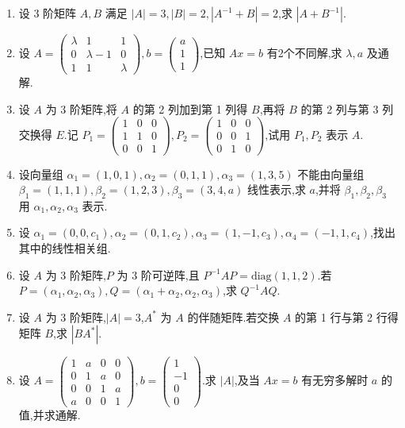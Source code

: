 \begin{enumerate}
	\item 设 3 阶矩阵 $A, B$ 满足 $|A|=3, |B|=2, |A^{-1}+B|=2$,求 $|A+B^{-1}|$.
	
	\item 设 $A = \begin{pmatrix} \lambda & 1 & 1 \\ 0 & \lambda-1 & 0 \\ 1 & 1 & \lambda \end{pmatrix}, b = \begin{pmatrix} a \\ 1 \\ 1 \end{pmatrix}$,已知 $Ax=b$ 有2个不同解,求 $\lambda, a$ 及通解.
	
	\item 设 $A$ 为 3 阶矩阵,将 $A$ 的第 2 列加到第 1 列得 $B$,再将 $B$ 的第 2 列与第 3 列交换得 $E$.记 $P_1 = \begin{pmatrix} 1 & 0 & 0 \\ 1 & 1 & 0 \\ 0 & 0 & 1 \end{pmatrix}, P_2 = \begin{pmatrix} 1 & 0 & 0 \\ 0 & 0 & 1 \\ 0 & 1 & 0 \end{pmatrix}$,试用 $P_1, P_2$ 表示 $A$.
	
	\item 设向量组 $\alpha_1=(1,0,1), \alpha_2=(0,1,1), \alpha_3=(1,3,5)$ 不能由向量组 $\beta_1=(1,1,1), \beta_2=(1,2,3), \beta_3=(3,4,a)$ 线性表示,求 $a$,并将 $\beta_1, \beta_2, \beta_3$ 用 $\alpha_1, \alpha_2, \alpha_3$ 表示.
	
	\item 设 $\alpha_1=(0,0,c_1), \alpha_2=(0,1,c_2), \alpha_3=(1,-1,c_3), \alpha_4=(-1,1,c_4)$,找出其中的线性相关组.
	
	\item 设 $A$ 为 3 阶矩阵,$P$ 为 3 阶可逆阵,且 $P^{-1}AP = \text{diag}(1, 1, 2)$.若 $P=(\alpha_1, \alpha_2, \alpha_3), Q=(\alpha_1+\alpha_2, \alpha_2, \alpha_3)$,求 $Q^{-1}AQ$.
	
	\item 设 $A$ 为 3 阶矩阵,$|A|=3$,$A^*$ 为 $A$ 的伴随矩阵.若交换 $A$ 的第 1 行与第 2 行得矩阵 $B$,求 $|BA^*|$.
	
	\item 设 $A = \begin{pmatrix} 1 & a & 0 & 0 \\ 0 & 1 & a & 0 \\ 0 & 0 & 1 & a \\ a & 0 & 0 & 1 \end{pmatrix}, b = \begin{pmatrix} 1 \\ -1 \\ 0 \\ 0 \end{pmatrix}$.求 $|A|$,及当 $Ax=b$ 有无穷多解时 $a$ 的值,并求通解.
	

\end{enumerate}
